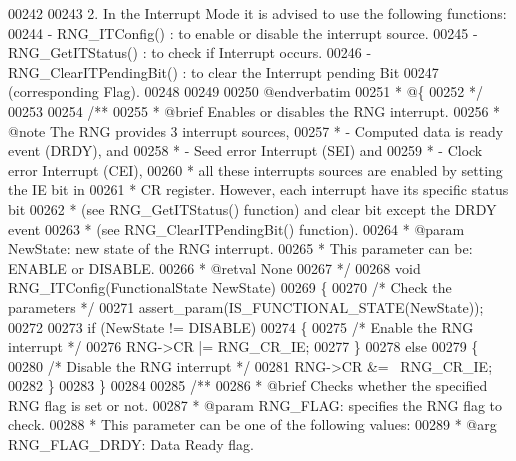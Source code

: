 \begin{DoxyCode}
00242 \textcolor{comment}{  }
00243 \textcolor{comment}{  2.  In the Interrupt Mode it is advised to use the following functions:}
00244 \textcolor{comment}{      - RNG\_ITConfig()       : to enable or disable the interrupt source.}
00245 \textcolor{comment}{      - RNG\_GetITStatus()    : to check if Interrupt occurs.}
00246 \textcolor{comment}{      - RNG\_ClearITPendingBit() : to clear the Interrupt pending Bit }
00247 \textcolor{comment}{                                (corresponding Flag). }
00248 \textcolor{comment}{  }
00249 \textcolor{comment}{}
00250 \textcolor{comment}{@endverbatim}
00251 \textcolor{comment}{  * @\{}
00252 \textcolor{comment}{  */}
00253 
00254 \textcolor{comment}{/**}
00255 \textcolor{comment}{  * @brief  Enables or disables the RNG interrupt.}
00256 \textcolor{comment}{  * @note   The RNG provides 3 interrupt sources,}
00257 \textcolor{comment}{  *           - Computed data is ready event (DRDY), and           }
00258 \textcolor{comment}{  *           - Seed error Interrupt (SEI) and }
00259 \textcolor{comment}{  *           - Clock error Interrupt (CEI), }
00260 \textcolor{comment}{  *         all these interrupts sources are enabled by setting the IE bit in }
00261 \textcolor{comment}{  *         CR register. However, each interrupt have its specific status bit}
00262 \textcolor{comment}{  *         (see RNG\_GetITStatus() function) and clear bit except the DRDY event}
00263 \textcolor{comment}{  *         (see RNG\_ClearITPendingBit() function).}
00264 \textcolor{comment}{  * @param  NewState: new state of the RNG interrupt.}
00265 \textcolor{comment}{  *          This parameter can be: ENABLE or DISABLE.}
00266 \textcolor{comment}{  * @retval None}
00267 \textcolor{comment}{  */}
00268 \textcolor{keywordtype}{void} RNG_ITConfig(FunctionalState NewState)
00269 \{
00270   \textcolor{comment}{/* Check the parameters */}
00271   assert_param(IS\_FUNCTIONAL\_STATE(NewState));
00272 
00273   \textcolor{keywordflow}{if} (NewState != DISABLE)
00274   \{
00275     \textcolor{comment}{/* Enable the RNG interrupt */}
00276     RNG->CR |= RNG_CR_IE;
00277   \}
00278   \textcolor{keywordflow}{else}
00279   \{
00280     \textcolor{comment}{/* Disable the RNG interrupt */}
00281     RNG->CR &= ~RNG_CR_IE;
00282   \}
00283 \}
00284 
00285 \textcolor{comment}{/**}
00286 \textcolor{comment}{  * @brief  Checks whether the specified RNG flag is set or not.}
00287 \textcolor{comment}{  * @param  RNG\_FLAG: specifies the RNG flag to check.}
00288 \textcolor{comment}{  *          This parameter can be one of the following values:}
00289 \textcolor{comment}{  *            @arg RNG\_FLAG\_DRDY: Data Ready flag.}

\end{DoxyCode}
